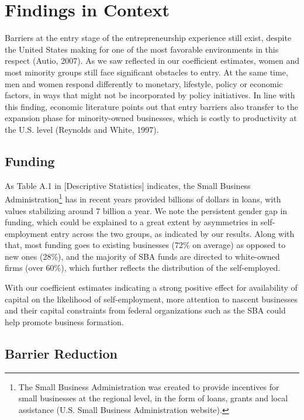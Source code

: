 \section{Findings in Context}

Barriers at the entry stage of the entrepreneurship experience still exist, despite the United States making for one of the most favorable environments in this respect (Autio, 2007). As we saw reflected in our coefficient estimates, women and most minority groups still face significant obstacles to entry. At the same time, men and women respond differently to monetary, lifestyle, policy or economic factors, in ways that might not be incorporated by policy initiatives. In line with this finding, economic literature points out that entry barriers also transfer to the expansion phase for minority-owned businesses, which is costly to productivity at the U.S. level (Reynolds and White, 1997). 

\subsection{Funding}

As Table A.1 in [Descriptive Statistics] indicates, the Small Business Administration\footnote{The Small Business Administration was created to provide incentives for small businesses at the regional level, in the form of loans, grants and local assistance (U.S. Small Business Administration website).} has in recent years provided billions of dollars in loans, with values stabilizing around 7 billion a year. We note the persistent gender gap in funding, which could be explained to a great extent by asymmetries in self-employment entry across the two groups, as indicated by our results. Along with that, most funding goes to existing businesses (72\% on average) as opposed to new ones (28\%), and the majority of SBA funds are directed to white-owned firms (over 60\%), which further reflects the distribution of the self-employed. 

With our coefficient estimates indicating a strong positive effect for availability of capital on the likelihood of self-employment, more attention to nascent businesses and their capital constraints from federal organizations such as the SBA could help promote business formation. 

\subsection{Barrier Reduction}

